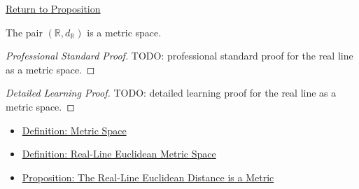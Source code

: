 \newpage
{}
\label{prf:real-line-euclidean-metric-space}

\begin{remark*}[Return]
\hyperref[prop:real-line-euclidean-metric-space]{Return to Proposition}
\end{remark*}

\begin{proposition*}
The pair \((\mathbb{R},d_{\mathbb{R}})\) is a metric space.
\end{proposition*}

\begin{proof}[Professional Standard Proof]
\LRAProofBodyStart
TODO: professional standard proof for the real line as a metric space.
\end{proof}

\begin{proof}[Detailed Learning Proof]
\LRAProofBodyStart
TODO: detailed learning proof for the real line as a metric space.
\end{proof}

\begin{remark*}
\end{remark*}

\begin{dependencies}
\begin{itemize}
  \item \hyperref[def:metric-space]{Definition: Metric Space}
  \item \hyperref[def:real-line-euclidean-metric-space]{Definition: Real-Line Euclidean Metric Space}
  \item \hyperref[prop:real-line-euclidean-distance-metric]{Proposition: The Real-Line Euclidean Distance is a Metric}
\end{itemize}
\end{dependencies}

\clearpage
